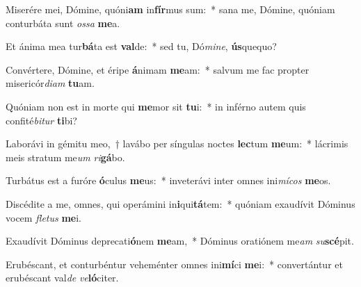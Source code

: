 \item Miserére mei, Dómine, quóni\textbf{am} in\textbf{fír}mus sum:~* sana me, Dómine, quóniam conturbáta sunt \textit{os}\textit{sa} \textbf{me}a.
\item Et ánima mea tur\textbf{bá}ta est \textbf{val}de:~* sed tu, Dó\textit{mi}\textit{ne}, \textbf{ús}quequo?
\item Convértere, Dómine, et éripe \textbf{á}nimam \textbf{me}am:~* salvum me fac propter misericór\textit{di}\textit{am} \textbf{tu}am.
\item Quóniam non est in morte qui \textbf{me}mor sit \textbf{tu}i:~* in inférno autem quis confité\textit{bi}\textit{tur} \textbf{ti}bi?
\item Laborávi in gémitu meo,~† lavábo per síngulas noctes \textbf{lec}tum \textbf{me}um:~* lácrimis meis stratum me\textit{um} \textit{ri}\textbf{gá}bo.
\item Turbátus est a furóre \textbf{ó}culus \textbf{me}us:~* inveterávi inter omnes ini\textit{mí}\textit{cos} \textbf{me}os.
\item Discédite a me, omnes, qui operámini in\textbf{i}qui\textbf{tá}tem:~* quóniam exaudívit Dóminus vocem \textit{fle}\textit{tus} \textbf{me}i.
\item Exaudívit Dóminus deprecati\textbf{ó}nem \textbf{me}am,~* Dóminus oratiónem me\textit{am} \textit{su}\textbf{scé}pit.
\item Erubéscant, et conturbéntur veheménter omnes ini\textbf{mí}ci \textbf{me}i:~* convertántur et erubéscant val\textit{de} \textit{ve}\textbf{ló}citer.
